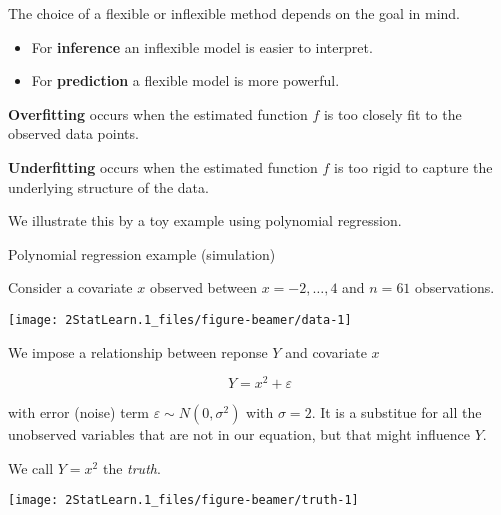 \documentclass[ignorenonframetext,]{beamer}
\providecommand{\tightlist}{%
  \setlength{\itemsep}{0pt}\setlength{\parskip}{0pt}}
\begin{document}
\begin{frame}

The choice of a flexible or inflexible method depends on the goal in
mind.

\begin{itemize}
\tightlist
\item
  For \textbf{inference} an inflexible model is easier to interpret.
\item
  For \textbf{prediction} a flexible model is more powerful.
\end{itemize}

\textbf{Overfitting} occurs when the estimated function \(f\) is too
closely fit to the observed data points.

\textbf{Underfitting} occurs when the estimated function \(f\) is too
rigid to capture the underlying structure of the data.

We illustrate this by a toy example using polynomial regression.

\end{frame}

\begin{frame}

\begin{block}{Polynomial regression example (simulation)}

Consider a covariate \(x\) observed between \(x=-2, \ldots , 4\) and
\(n=61\) observations.

\begin{center}\texttt{[image: 2StatLearn.1\_files/figure-beamer/data-1]} \end{center}

\end{block}

\end{frame}

\begin{frame}

We impose a relationship between reponse \(Y\) and covariate \(x\)

\[ Y=x^2 + \varepsilon\]

with error (noise) term \(\varepsilon\sim N(0,\sigma^2)\) with
\(\sigma=2\). It is a substitue for all the unobserved variables that
are not in our equation, but that might influence \(Y\).

We call \(Y=x^2\) the \emph{truth}.

\end{frame}

\begin{frame}

\begin{center}\texttt{[image: 2StatLearn.1\_files/figure-beamer/truth-1]} \end{center}

\end{frame}
\end{document}
